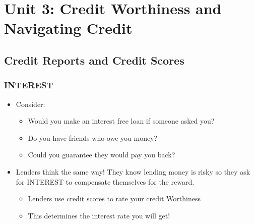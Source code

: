 \documentclass[12pt]{article}
\begin{document}
    \section {Unit 3: Credit Worthiness and Navigating Credit}

        \subsection{Credit Reports and Credit Scores}
            \subsubsection{INTEREST}
                \begin{itemize}
                    \item Consider:
                        \begin{itemize}
                            \item Would you make an interest free loan if someone asked you?
                            \item Do you have friends who owe you money?
                            \item Could you guarantee they would pay you back?
                        \end{itemize}
                    \item Lenders think the same way! They know lending money is risky so they ask for INTEREST to compensate themselves
                        for the reward.
                        \begin{itemize}
                            \item Lenders use credit scores to rate your credit Worthiness
                            \item This determines the interest rate you will get!
                        \end{itemize}
                \end{itemize}
\end{document}
